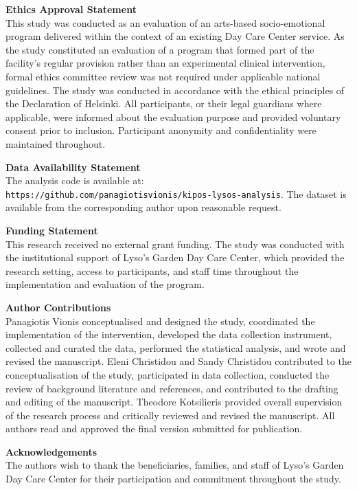 \documentclass[12pt,a4paper]{article}
\begin{document}
\noindent\textbf{Ethics Approval Statement}\\
This study was conducted as an evaluation of an arts-based socio-emotional
program delivered within the context of an existing Day Care Center service.
As the study constituted an evaluation of a program that formed part of the
facility's regular provision rather than an experimental clinical intervention,
formal ethics committee review was not required under applicable national
guidelines. The study was conducted in accordance with the ethical principles
of the Declaration of Helsinki. All participants, or their legal guardians
where applicable, were informed about the evaluation purpose and provided
voluntary consent prior to inclusion. Participant anonymity and
confidentiality were maintained throughout.

\vspace{0.6cm}

\noindent\textbf{Data Availability Statement}\\
The analysis code is available at:
\texttt{https://github.com/panagiotisvionis/kipos-lysos-analysis}.
The dataset is available from the corresponding author upon reasonable request.

\vspace{0.6cm}

\noindent\textbf{Funding Statement}\\
This research received no external grant funding. The study was conducted with
the institutional support of Lyso's Garden Day Care Center, which provided
the research setting, access to participants, and staff time throughout the
implementation and evaluation of the program.

\vspace{0.6cm}

\noindent\textbf{Author Contributions}\\
Panagiotis Vionis conceptualised and designed the study, coordinated the implementation
of the intervention, developed the data collection instrument, collected and curated
the data, performed the statistical analysis, and wrote and revised the manuscript.
Eleni Christidou and Sandy Christidou contributed to the conceptualisation of the
study, participated in data collection, conducted the review of background literature
and references, and contributed to the drafting and editing of the manuscript.
Theodore Kotsilieris provided overall supervision of the research process and
critically reviewed and revised the manuscript.
All authors read and approved the final version submitted for publication.

\vspace{0.6cm}

\noindent\textbf{Acknowledgements}\\
The authors wish to thank the beneficiaries, families, and staff of Lyso's Garden
Day Care Center for their participation and commitment throughout the study.
\end{document}
